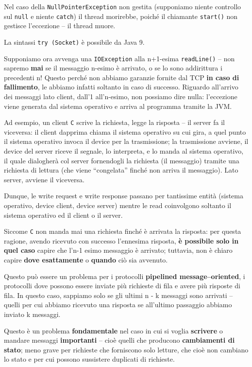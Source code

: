 \documentclass[\fontsizeclass,twocolumn]{\classname}
\theoremstyle{definition}
\theoremstyle{definition}
\begin{document}
Nel caso della \texttt{NullPointer\-Exception} non gestita (supponiamo niente
controllo sul \texttt{null} e niente \texttt{catch}) il thread morirebbe,
poiché il chiamante \texttt{start()} non gestisce l'eccezione -- il thread
muore.

La sintassi \texttt{try (Socket)} è possibile da Java 9.

Supponiamo ora avvenga una \texttt{IOException} alla n+1-esima
\texttt{readLine()} -- non sapremo \textbf{mai} se il messaggio n-esimo è
arrivato, o se lo sono addirittura i precedenti n! Questo perché non abbiamo
garanzie fornite dal TCP \textbf{in caso di fallimento}, le abbiamo infatti
soltanto in caso di successo. Riguardo all'arrivo dei messaggi lato client,
dall'1 all'n-esimo, non possiamo dire nulla: l'eccezione viene generata dal
sistema operativo e arriva al programma tramite la JVM.

Ad esempio, un client \texttt{C} scrive la richiesta, legge la risposta -- il
server fa il viceversa: il client dapprima chiama il sistema operativo su cui
gira, a quel punto il sistema operativo invoca il device per la trasmissione;
la trasmissione avviene, il device del server riceve il segnale, lo interpreta,
e lo manda al sistema operativo, il quale dialogherà col server fornendogli la
richiesta (il messaggio) tramite una richiesta di lettura (che viene
``congelata'' finché non arriva il messaggio). Lato server, avviene il
viceversa.

Dunque, le write request e write response passano per tantissime entità
(sistema operativo, device client, device server) mentre le read coinvolgono
soltanto il sistema operativo ed il client o il server.

Siccome \texttt{C} non manda mai una richiesta finché è arrivata la risposta:
per questa ragione, avendo ricevuto con successo l'ennesima risposta, \textbf{è
possibile solo in quel caso} capire che l'n-1 esimo messaggio è arrivato;
tuttavia, non è chiaro capire \textbf{dove esattamente} o \textbf{quando} ciò
sia avvenuto.

Questo può essere un problema per i protocolli \textbf{pipelined
message--oriented}, i protocolli dove possono essere inviate più richieste di
fila e avere più risposte di fila. In questo caso, sappiamo solo se gli ultimi
n - k messaggi sono arrivati -- quelli per cui abbiamo ricevuto una risposta se
all'ultimo passaggio abbiamo inviato k messaggi.

Questo è un problema \textbf{fondamentale} nel caso in cui si voglia
\textbf{scrivere} o mandare messaggi \textbf{importanti} -- cioè quelli che
producono \textbf{cambiamenti di stato}; meno grave per richieste che
forniscono solo letture, che cioè non cambiano lo stato e per cui possono
sussistere duplicati di richieste.
\end{document}
